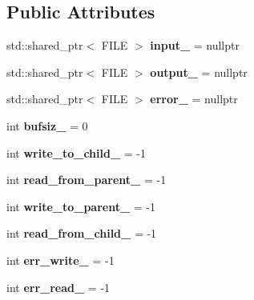 \subsection*{Public Attributes}
\begin{DoxyCompactItemize}
\item 
\mbox{\label{classsubprocess_1_1detail_1_1Streams_aea4fa1a8cb831261687c4a2744a9f24e}} 
std\+::shared\+\_\+ptr$<$ F\+I\+LE $>$ {\bfseries input\+\_\+} = nullptr
\item 
\mbox{\label{classsubprocess_1_1detail_1_1Streams_a5cfb9fe7731efec85560c313f9ac6de8}} 
std\+::shared\+\_\+ptr$<$ F\+I\+LE $>$ {\bfseries output\+\_\+} = nullptr
\item 
\mbox{\label{classsubprocess_1_1detail_1_1Streams_a67d61caca4c3b25a44f1e5bd6b69dd06}} 
std\+::shared\+\_\+ptr$<$ F\+I\+LE $>$ {\bfseries error\+\_\+} = nullptr
\item 
\mbox{\label{classsubprocess_1_1detail_1_1Streams_a61b41130853c8b806f8d880ed87c6f66}} 
int {\bfseries bufsiz\+\_\+} = 0
\item 
\mbox{\label{classsubprocess_1_1detail_1_1Streams_ac5b3b837e8f0b2ddc01231c9b3a60eec}} 
int {\bfseries write\+\_\+to\+\_\+child\+\_\+} = -\/1
\item 
\mbox{\label{classsubprocess_1_1detail_1_1Streams_ac57099c94684d23bf7131e822123ed05}} 
int {\bfseries read\+\_\+from\+\_\+parent\+\_\+} = -\/1
\item 
\mbox{\label{classsubprocess_1_1detail_1_1Streams_ac8d36f16af4b3437b082b94174c5706b}} 
int {\bfseries write\+\_\+to\+\_\+parent\+\_\+} = -\/1
\item 
\mbox{\label{classsubprocess_1_1detail_1_1Streams_a85917dc2b5b568b15ec0cd2c5b208678}} 
int {\bfseries read\+\_\+from\+\_\+child\+\_\+} = -\/1
\item 
\mbox{\label{classsubprocess_1_1detail_1_1Streams_adff2cf35ebb10e8bc8ff39b55ff11564}} 
int {\bfseries err\+\_\+write\+\_\+} = -\/1
\item 
\mbox{\label{classsubprocess_1_1detail_1_1Streams_abd0cb3cdd4cf0fb72a89896a629bb902}} 
int {\bfseries err\+\_\+read\+\_\+} = -\/1
\end{DoxyCompactItemize}


